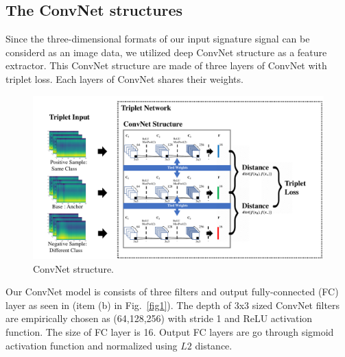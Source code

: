 \subsection{The ConvNet structures}
Since the three-dimensional formats of our input signature signal can be considerd as an image data, we utilized deep ConvNet structure as a feature extractor. This ConvNet structure are made of three layers of ConvNet with triplet loss. Each layers of ConvNet shares their weights. 
\begin{figure}[!ht]
    \includegraphics[width=\textwidth]
        {fig_convnet_v1.pdf}
    \caption{ConvNet structure.} \label{fig2}
\end{figure}
Our ConvNet model is consists of three filters and output fully-connected (FC) layer as seen in (item (b) in Fig.~\ref{fig1}). The depth of 3x3 sized ConvNet filters are empirically chosen as (64,128,256) with stride 1 and ReLU activation function. The size of FC layer is 16. Output FC layers are go through sigmoid activation function and normalized using $L2$ distance.
